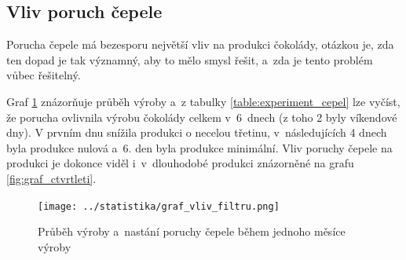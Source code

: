 \documentclass[11pt,a4paper,titlepage]{article}
\begin{document}
		\subsection{Vliv poruch čepele}
			Porucha čepele má bezesporu největší vliv na produkci čokolády, otázkou
			je, zda ten dopad je tak významný, aby to mělo smysl řešit, a~zda je tento
			problém vůbec řešitelný.

			Graf \ref{fig:graf_cepel} znázorňuje průběh výroby a~z tabulky \ref{table:experiment_cepel}
			lze vyčíst, že porucha ovlivnila výrobu čokolády celkem v~6~dnech (z toho 2 byly víkendové dny).
			V prvním dnu snížila produkci o necelou třetinu, v~následujících 4 dnech byla produkce nulová
			a~6. den byla produkce minimální. Vliv poruchy čepele na produkci je dokonce viděl
			i~v~dlouhodobé produkci znázorněné na grafu \ref{fig:graf_ctvrtleti}.

			\begin{figure}[H]
			\begin{center}
				\texttt{[image: ../statistika/graf\_vliv\_filtru.png]}
				\caption{ Průběh výroby a~nastání poruchy čepele během jednoho měsíce výroby }
				\label{fig:graf_cepel}
			\end{center}
			\end{figure}
\end{document}
